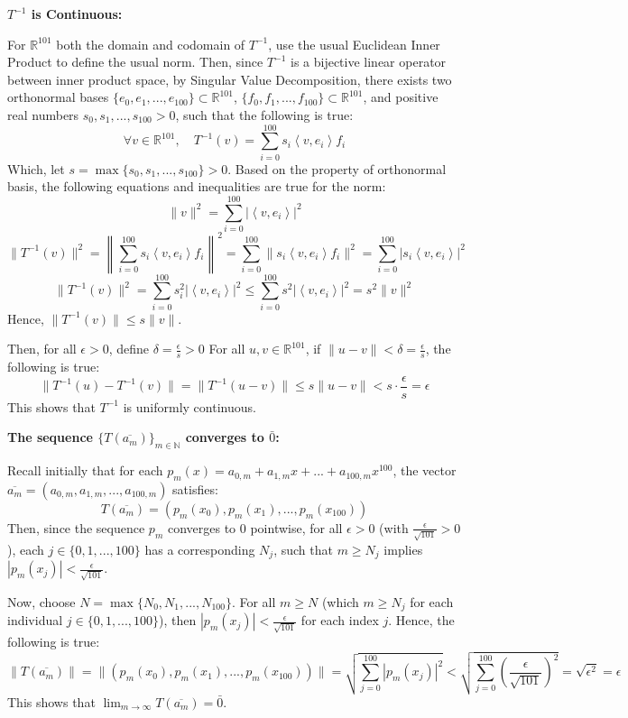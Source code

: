 \documentclass{article}
\begin{document}
\begin{itemize}
    \hfill

    \textbf{$T^{-1}$ is Continuous:}

    For $\mathbb{R}^{101}$ both the domain and codomain of $T^{-1}$, use the usual Euclidean Inner Product to define the usual norm.
    Then, since $T^{-1}$ is a bijective linear operator between inner product space, by Singular Value Decomposition,
    there exists two orthonormal bases $\{e_0,e_1,...,e_{100}\}\subset\mathbb{R}^{101}$, $\{f_0,f_1,...,f_{100}\}\subset \mathbb{R}^{101}$, and positive real numbers $s_0,s_1,...,s_{100}>0$, such that the following is true:
    $$\forall v\in\mathbb{R}^{101},\quad T^{-1}(v)=\sum_{i=0}^{100}s_i\left<v,e_i\right>f_i$$
    Which, let $s=\max\{s_0,s_1,...,s_{100}\}>0$. Based on the property of orthonormal basis, the following equations and inequalities are true for the norm:
    $$\|v\|^2=\sum_{i=0}^{100}|\left<v,e_i\right>|^2$$
    $$\|T^{-1}(v)\|^2 = \left\|\sum_{i=0}^{100}s_i\left<v,e_i\right>f_i\right\|^2 = \sum_{i=0}^{100}\|s_i\left<v,e_i\right>f_i\|^2 = \sum_{i=0}^{100}|s_i\left<v,e_i\right>|^2$$
    $$\|T^{-1}(v)\|^2=\sum_{i=0}^{100}s_i^2|\left<v,e_i\right>|^2\leq \sum_{i=0}^{100}s^2|\left<v,e_i\right>|^2 = s^2\|v\|^2$$
    Hence, $\|T^{-1}(v)\|\leq s\|v\|$.

    Then, for all $\epsilon>0$, define $\delta=\frac{\epsilon}{s}>0$ For all $u,v\in\mathbb{R}^{101}$, if $\|u-v\|<\delta=\frac{\epsilon}{s}$, the following is true:
    $$\|T^{-1}(u)-T^{-1}(v)\| = \|T^{-1}(u-v)\|\leq s\|u-v\|<s\cdot\frac{\epsilon}{s}=\epsilon$$
    This shows that $T^{-1}$ is uniformly continuous.

    \hfill

    \textbf{The sequence $\{T(\overline{a_m})\}_{m\in\mathbb{N}}$ converges to $\bar{0}$:}

    Recall initially that for each $p_m(x)=a_{0,m}+a_{1,m}x+...+a_{100,m}x^{100}$, the vector $\overline{a_m}=(a_{0,m},a_{1,m},...,a_{100,m})$ satisfies:
    $$T(\overline{a_m})=(p_m(x_0),p_m(x_1),...,p_m(x_{100}))$$
    Then, since the sequence $p_m$ converges to $0$ pointwise, for all $\epsilon>0$ (with $\frac{\epsilon}{\sqrt{101}}>0$), each $j\in\{0,1,...,100\}$ has a corresponding $N_j$, such that $m\geq N_j$ implies $|p_m(x_j)|<\frac{\epsilon}{\sqrt{101}}$.

    Now, choose $N=\max\{N_0,N_1,...,N_{100}\}$. For all $m\geq N$ (which $m\geq N_j$ for each individual $j\in\{0,1,...,100\}$), then $|p_m(x_j)|<\frac{\epsilon}{\sqrt{101}}$ for each index $j$.
    Hence, the following is true:
    $$\|T(\overline{a_m})\|=\|(p_m(x_0),p_m(x_1),...,p_m(x_{100}))\| = \sqrt{\sum_{j=0}^{100}|p_m(x_j)|^2} < \sqrt{\sum_{j=0}^{100}\left(\frac{\epsilon}{\sqrt{101}}\right)^2} = \sqrt{\epsilon^2} = \epsilon$$
    This shows that $\lim_{m\rightarrow\infty}T(\overline{a_m})=\bar{0}$.


\end{itemize}
\end{document}
